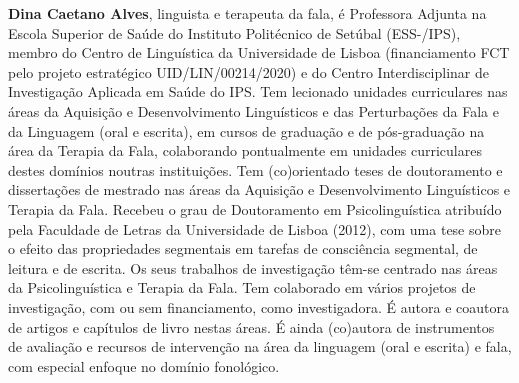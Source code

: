 \begin{refsection}
\textbf{Dina Caetano Alves}, linguista e terapeuta da fala, é Professora Adjunta na Escola Superior de Saúde do Instituto Politécnico de Setúbal (ESS-/IPS), membro do Centro de Linguística da Universidade de Lisboa (financiamento FCT pelo projeto estratégico UID/LIN/00214/2020) e do Centro Interdisciplinar de Investigação Aplicada em Saúde do IPS. Tem lecionado unidades curriculares nas áreas da Aquisição e Desenvolvimento Linguísticos e das Perturbações da Fala e da Linguagem (oral e escrita), em cursos de graduação e de pós-graduação na área da Terapia da Fala, colaborando pontualmente em unidades curriculares destes domínios noutras instituições. Tem (co)orientado teses de doutoramento e dissertações de mestrado nas áreas da Aquisição e Desenvolvimento Linguísticos e Terapia da Fala. Recebeu o grau de Doutoramento em Psicolinguística atribuído pela Faculdade de Letras da Universidade de Lisboa (2012), com uma tese sobre o efeito das propriedades segmentais em tarefas de consciência segmental, de leitura e de escrita. Os seus trabalhos de investigação têm-se centrado nas áreas da Psicolinguística e Terapia da Fala. Tem colaborado em vários projetos de investigação, com ou sem financiamento, como investigadora. É autora e coautora de artigos e capítulos de livro nestas áreas. É ainda (co)autora de instrumentos de avaliação e recursos de intervenção na área da linguagem (oral e escrita) e fala, com especial enfoque no domínio fonológico.

{\sloppy\printbibliography[heading=subbibliography,notkeyword=this]}


\end{refsection}

